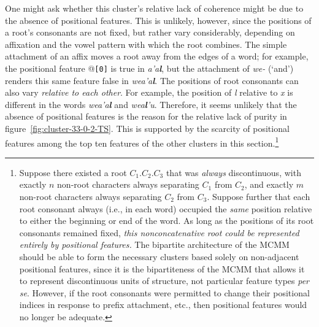 One might ask whether this cluster's relative lack of coherence might be due to the absence of positional features. This is unlikely, however,
since the positions of a root's consonants are not fixed, but rather vary considerably, depending on affixation and the vowel pattern with which the root combines.
 The simple attachment of an affix moves a root away from the edges of a word; for example,
 the positional feature  \texttt{{}}@\texttt{[0]} is true in \textit{\textbf{}a\textbf{}\a'{a}\textbf{l}}, but the attachment of \textit{we-} (`and') renders this same feature false in \textit{we\textbf{}a\textbf{}\a'{a}\textbf{l}}.
The positions of root consonants can also vary \textit{relative to each other}.  
For example, the position of \textit{l} relative to \textit{x} is different in the words \textit{we\textbf{}a\textbf{}\a'{a}\textbf{l}} and \textit{we\textbf{}a\textbf{}\textbf{l}\a'{u}}.
Therefore, it seems unlikely that the absence of positional features is the reason for the relative lack of purity in figure~\ref{fig:cluster-33-0-2-TS}. This is supported by the scarcity of positional features among the top ten features of the other clusters in this section.\footnote{Suppose there existed a root $C_1$.$C_2$.$C_3$ that was \emph{always} discontinuous, with exactly $n$ non-root characters always separating $C_1$ from $C_2$, and exactly $m$ non-root characters always separating $C_2$ from $C_3$. Suppose further that each root consonant always (i.e., in each word) occupied the \emph{same} position relative to either the beginning or end of the word. As long as the positions of its root consonants remained fixed, \emph{this nonconcatenative root could be represented entirely by positional features.} 
The bipartite architecture of the MCMM should be able to form the necessary clusters based solely on non-adjacent positional features, since it is the bipartiteness of the MCMM that allows it to represent discontinuous units of structure, not particular feature types \textit{per se}. However, if the root consonants were permitted to change their positional indices in response to prefix attachment, etc., then positional features would no longer be adequate.}

